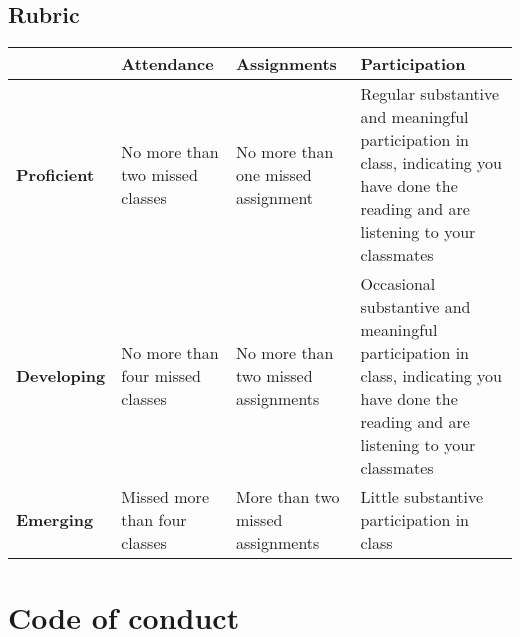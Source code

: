\documentclass[
]{report}
\begin{document}
\hypertarget{rubric}{%
\subsection*{Rubric}\label{rubric}}

\begin{table}
\centering
\begin{tabular}{>{\raggedright\arraybackslash}p{5em}|>{\raggedright\arraybackslash}p{9em}>{\raggedright\arraybackslash}p{9em}>{\raggedright\arraybackslash}p{13em}}
\toprule
 & Attendance & Assignments & Participation\\
\midrule
\textbf{Proficient} & No more than two missed classes & No more than one missed assignment & Regular substantive and meaningful participation in class, indicating you have done the reading and are listening to your classmates\\
\textbf{Developing} & No more than four missed classes & No more than two missed assignments & Occasional substantive and meaningful participation in class, indicating you have done the reading and are listening to your classmates\\
\textbf{Emerging} & Missed more than four classes & More than two missed assignments & Little substantive participation in class\\
\bottomrule
\end{tabular}
\end{table}

\hypertarget{code-of-conduct}{%
\section*{Code of conduct}\label{code-of-conduct}}
\end{document}
